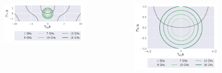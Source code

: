 \documentclass{beamer}
\begin{document}
		\begin{frame}
			\begin{columns}[c]
				\begin{figure}[h]
					\includegraphics[width=\textwidth]{intro_electro/TM-tan-implicito}
				\end{figure}
				\begin{figure}[h]
					\includegraphics[width=\textwidth]{intro_electro/TM-tan-implicito-zoom}
				\end{figure}
				

\end{columns}
\end{frame}
\end{document}
